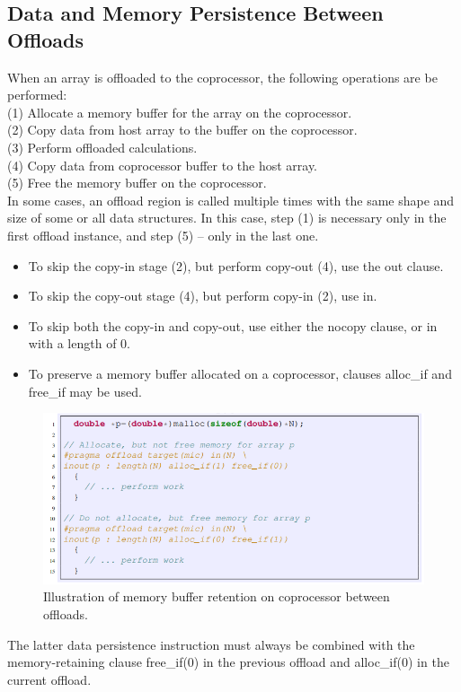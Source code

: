 \documentclass[12pt]{article}
\begin{document}
\subsection{Data and Memory Persistence Between Offloads}
When an array is offloaded to the coprocessor, the following operations are be performed:\\
(1) Allocate a memory buffer for the array on the coprocessor.\\
(2) Copy data from host array to the buffer on the coprocessor.\\
(3) Perform offloaded calculations.\\
(4) Copy data from coprocessor buffer to the host array.\\
(5) Free the memory buffer on the coprocessor.\\
In some cases, an offload region is called multiple times with the same shape and size of some or all data structures. In this case, step (1) is necessary only in the first offload instance, and step (5) – only in the last one. 
\begin{itemize}
\item To skip the copy-in stage (2), but perform copy-out (4), use the out clause.
\item To skip the copy-out stage (4), but perform copy-in (2), use in.
\item To skip both the copy-in and copy-out, use either the nocopy clause, or in with a length of 0.
\item To preserve a memory buffer allocated on a coprocessor, clauses alloc\_if and free\_if may be used. 
\end{itemize}
\begin{figure}[H]
\centering
\includegraphics[scale = 0.9]{chainer14.png}
\caption{Illustration of memory buffer retention on coprocessor between offloads.}
\end{figure}
The latter data persistence instruction must always be combined with the memory-retaining clause free\_if(0) in the previous offload and alloc\_if(0) in the current offload. 
\end{document}
